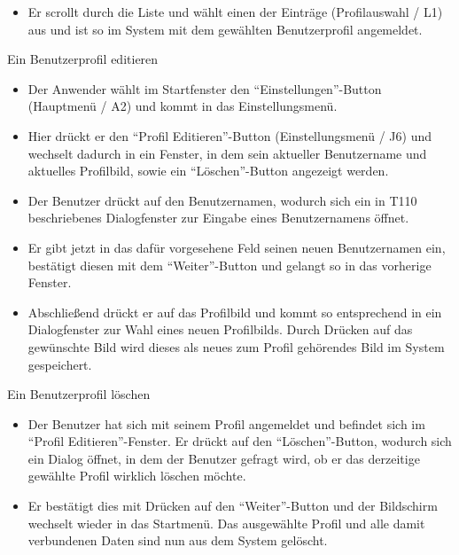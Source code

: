 \begin{requirements}
\begin{itemize}
  			\item Er scrollt durch die Liste und wählt einen der Einträge (Profilauswahl / L1) aus und ist so im System mit dem gewählten Benutzerprofil angemeldet.
  			
	\end{itemize}
  	
  	
	
	 Ein Benutzerprofil editieren
	
	
	\begin{itemize}
  			\item Der Anwender wählt im Startfenster den "`Einstellungen"'-Button (Hauptmenü / A2) und kommt in das Einstellungsmenü.
  			
  			\item Hier drückt er den "`Profil Editieren"'-Button (Einstellungsmenü / J6) und wechselt dadurch in ein Fenster, in dem sein aktueller Benutzername und aktuelles Profilbild, sowie ein "`Löschen"'-Button angezeigt werden.
  			
  			\item Der Benutzer drückt auf den Benutzernamen, wodurch sich ein in T110 beschriebenes Dialogfenster zur Eingabe eines Benutzernamens öffnet.
  			
  			\item Er gibt jetzt in das dafür vorgesehene Feld seinen neuen Benutzernamen ein, bestätigt diesen mit dem "`Weiter"'-Button und gelangt so in das vorherige Fenster.
  			
  			\item Abschließend drückt er auf das Profilbild und kommt so entsprechend in ein Dialogfenster zur Wahl eines neuen Profilbilds. Durch Drücken auf das gewünschte Bild wird dieses als neues zum Profil gehörendes Bild im System gespeichert.
  			
  			
  	\end{itemize}

  	
	
	
	 Ein Benutzerprofil löschen
	
	
	\begin{itemize}
  			\item Der Benutzer hat sich mit seinem Profil angemeldet und befindet sich im "`Profil Editieren"'-Fenster.
			Er drückt auf den "`Löschen"'-Button, wodurch sich ein Dialog öffnet, in dem der Benutzer gefragt wird, ob er das derzeitige gewählte Profil wirklich löschen möchte.
  			
  			\item Er bestätigt dies mit Drücken auf den "`Weiter"'-Button und der Bildschirm wechselt wieder in das Startmenü. Das ausgewählte Profil und alle damit verbundenen Daten sind nun aus dem System gelöscht.
  			

\end{itemize}
\end{requirements}
